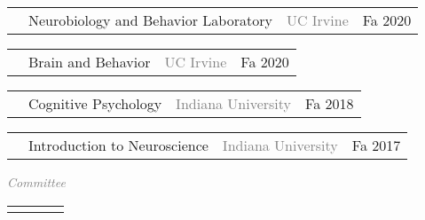 \documentclass[11pt]{cooperCV_v1/cooperCV} %
\begin{document}
\begin{minipage}{\textwidth}
        \textcolor{gray}{{\emph{}}} 
        \begin{tabular}{ p{} %
                        p{}
                        p{} 
                        p{}} %
        \small &  Neurobiology and Behavior Laboratory & {\hfill}\textcolor{gray}{\small{UC Irvine}} & {\hfill}\small{Fa 2020}\\ 
        \end{tabular}
      
        \textcolor{gray}{{\emph{}}} 
        \begin{tabular}{ p{} %
                        p{}
                        p{} 
                        p{}} %
        \small &  Brain and Behavior & {\hfill}\textcolor{gray}{\small{UC Irvine}} & {\hfill}\small{Fa 2020}\\ 
        \end{tabular}
      
        \textcolor{gray}{{\emph{}}} 
        \begin{tabular}{ p{} %
                        p{}
                        p{} 
                        p{}} %
        \small &  Cognitive Psychology & {\hfill}\textcolor{gray}{\small{Indiana University}} & {\hfill}\small{Fa 2018}\\ 
        \end{tabular}
      
        \textcolor{gray}{{\emph{}}} 
        \begin{tabular}{ p{} %
                        p{}
                        p{} 
                        p{}} %
        \small &  Introduction to Neuroscience & {\hfill}\textcolor{gray}{\small{Indiana University}} & {\hfill}\small{Fa 2017}\\ 
        \end{tabular}
      
  

  
    
        \textcolor{gray}{{\emph{Committee}}} 
        \begin{tabular}{ p{} %
                        p{}
                        p{} 
                        p{}} %
        \small &   & {\hfill}\textcolor{gray}{\small{}} & {\hfill}\small{}\\ 
        \end{tabular}
      

\end{minipage}
\end{document}
